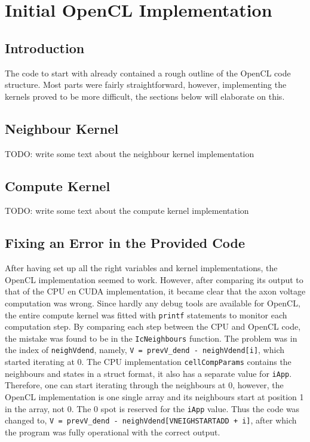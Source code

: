 \documentclass[final]{report}
\begin{document}
\chapter{Initial OpenCL Implementation}\label{ch:initopencl}

\section{Introduction}
The code to start with already contained a rough outline of the OpenCL code structure.
Most parts were fairly straightforward, however, implementing the kernels proved to be more difficult, the sections below will elaborate on this.

\section{Neighbour Kernel}
TODO: write some text about the neighbour kernel implementation

\section{Compute Kernel}
TODO: write some text about the compute kernel implementation

\section{Fixing an Error in the Provided Code}
After having set up all the right variables and kernel implementations, the OpenCL implementation seemed to work.
However, after comparing its output to that of the CPU en CUDA implementation, it became clear that the axon voltage computation was wrong.
Since hardly any debug tools are available for OpenCL, the entire compute kernel was fitted with \texttt{printf} statements to monitor each computation step.
By comparing each step between the CPU and OpenCL code, the mistake was found to be in the \texttt{IcNeighbours} function.
The problem was in the index of \texttt{neighVdend}, namely, \texttt{V = prevV\_dend - neighVdend[i]\;}, which started iterating at 0.
The CPU implementation \texttt{cellCompParams} contains the neighbours and states in a struct format, it also has a separate value for \texttt{iApp}.
Therefore, one can start iterating through the neighbours at 0, however, the OpenCL implementation is one single array and its neighbours start at position 1 in the array, not 0.
The 0 spot is reserved for the \texttt{iApp} value.
Thus the code was changed to, \texttt{V = prevV\_dend - neighVdend[VNEIGHSTARTADD + i]\;}, after which the program was fully operational with the correct output.
\end{document}
